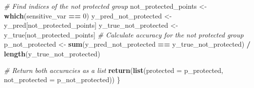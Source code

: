 \documentclass[
]{article}
\newenvironment{Shaded}{\begin{snugshade}}{\end{snugshade}}
\newcommand{\AttributeTok}[1]{\textcolor[rgb]{0.13,0.29,0.53}{#1}}
\newcommand{\CommentTok}[1]{\textcolor[rgb]{0.56,0.35,0.01}{\textit{#1}}}
\newcommand{\DecValTok}[1]{\textcolor[rgb]{0.00,0.00,0.81}{#1}}
\newcommand{\FunctionTok}[1]{\textcolor[rgb]{0.13,0.29,0.53}{\textbf{#1}}}
\newcommand{\NormalTok}[1]{#1}
\newcommand{\OtherTok}[1]{\textcolor[rgb]{0.56,0.35,0.01}{#1}}
\newcommand{\SpecialCharTok}[1]{\textcolor[rgb]{0.81,0.36,0.00}{\textbf{#1}}}
\newcommand{\StringTok}[1]{\textcolor[rgb]{0.31,0.60,0.02}{#1}}
\begin{document}
\begin{Shaded}
\begin{Highlighting}[]
  \CommentTok{\# Find indices of the not protected group}
\NormalTok{  not\_protected\_points }\OtherTok{\textless{}{-}} \FunctionTok{which}\NormalTok{(sensitive\_var }\SpecialCharTok{==} \DecValTok{0}\NormalTok{)}
\NormalTok{  y\_pred\_not\_protected }\OtherTok{\textless{}{-}}\NormalTok{ y\_pred[not\_protected\_points]}
\NormalTok{  y\_true\_not\_protected }\OtherTok{\textless{}{-}}\NormalTok{ y\_true[not\_protected\_points]}
  \CommentTok{\# Calculate accuracy for the not protected group}
\NormalTok{  p\_not\_protected }\OtherTok{\textless{}{-}} \FunctionTok{sum}\NormalTok{(y\_pred\_not\_protected }\SpecialCharTok{==}\NormalTok{ y\_true\_not\_protected) }\SpecialCharTok{/} \FunctionTok{length}\NormalTok{(y\_true\_not\_protected)}
  
  \CommentTok{\# Return both accuracies as a list}
  \FunctionTok{return}\NormalTok{(}\FunctionTok{list}\NormalTok{(}\AttributeTok{protected =}\NormalTok{ p\_protected, }\AttributeTok{not\_protected =}\NormalTok{ p\_not\_protected))}
\NormalTok{\}}
\end{Highlighting}
\end{Shaded}

\begin{Shaded}
\end{Shaded}
\end{document}
